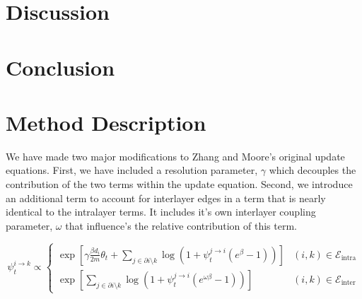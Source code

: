 \documentclass[11pt]{article}
\begin{document}
\section{Discussion}
\section{Conclusion}

\section{Method Description \label{methods}}

We have made two major modifications to Zhang and Moore's original  update equations.  First, we have included a resolution parameter, $\gamma$ which decouples the contribution of the two terms within the update equation.  Second, we introduce an additional term to account for interlayer edges in a term that is nearly identical to the intralayer terms.  It includes it's own interlayer coupling parameter, $\omega$ that influence's the relative contribution of this term.  


\begin{equation}
\psi^{i \to k }_t \propto \begin{cases}  \exp {\left [ \gamma \frac{\beta d_i }{2m}\theta_t  + \sum_{j\in \partial i \setminus k} \log{(1+\psi^{j \to i }_t(e^{\beta}-1))} \right]} & (i,k) \in \mathcal{E}_{\text{intra}}\\ 
\exp {\left [  \sum_{j\in \partial i \setminus k} \log{(1+\psi^{j \to i }_t(e^{\omega\beta}-1))}\right ]} & (i,k)\in \mathcal{E}_{\text{inter}} \end{cases}
\end{equation}

\end{document}
